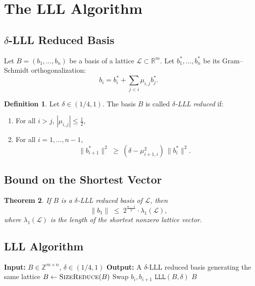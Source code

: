 \documentclass[11pt]{article}
\theoremstyle{plain}
\newtheorem{theorem}{Theorem}[section]
\theoremstyle{definition}
\newtheorem{definition}[theorem]{Definition}
\newcommand{\Z}{\mathbb{Z}}
\newcommand{\R}{\mathbb{R}}
\begin{document}
\section{The LLL Algorithm}

\subsection{$\delta$-LLL Reduced Basis}

Let $B = (b_1, \dots, b_n)$ be a basis of a lattice $\mathcal{L} \subset \R^m$.
Let $b_1^*, \dots, b_n^*$ be its Gram--Schmidt orthogonalization:
\[
  b_i = b_i^* + \sum_{j<i} \mu_{i,j} b_j^*.
\]

\begin{definition}
Let $\delta \in (1/4,1)$. The basis $B$ is called \emph{$\delta$-LLL reduced} if:
\begin{enumerate}
  \item For all $i > j$, $|\mu_{i,j}| \leq \tfrac{1}{2}$,
  \item For all $i = 1, \dots, n-1$,
  \[
    \|b_{i+1}^*\|^2 \;\geq\; (\delta - \mu_{i+1,i}^2)\,\|b_i^*\|^2.
  \]
\end{enumerate}
\end{definition}

\subsection{Bound on the Shortest Vector}

\begin{theorem}
If $B$ is a $\delta$-LLL reduced basis of $\mathcal{L}$, then
\[
  \|b_1\| \;\leq\; 2^{\frac{n-1}{2}} \cdot \lambda_1(\mathcal{L}),
\]
where $\lambda_1(\mathcal{L})$ is the length of the shortest nonzero lattice vector.
\end{theorem}

\subsection{LLL Algorithm}

\begin{algorithm}[H]
\caption{\texttt{LLL(B, $\delta$)}}
\begin{algorithmic}[1]
    \State \textbf{Input:} $B \in \Z^{m \times n}$, $\delta \in (1/4,1)$
    \State \textbf{Output:} A $\delta$-LLL reduced basis generating the same lattice
    \State $B \gets \textsc{SizeReduce}(B)$
        \State Swap $b_i, b_{i+1}$
        \State \Return $\texttt{LLL}(B, \delta)$
    \EndIf
    \State \Return $B$
\end{algorithmic}
\end{algorithm}
\end{document}
